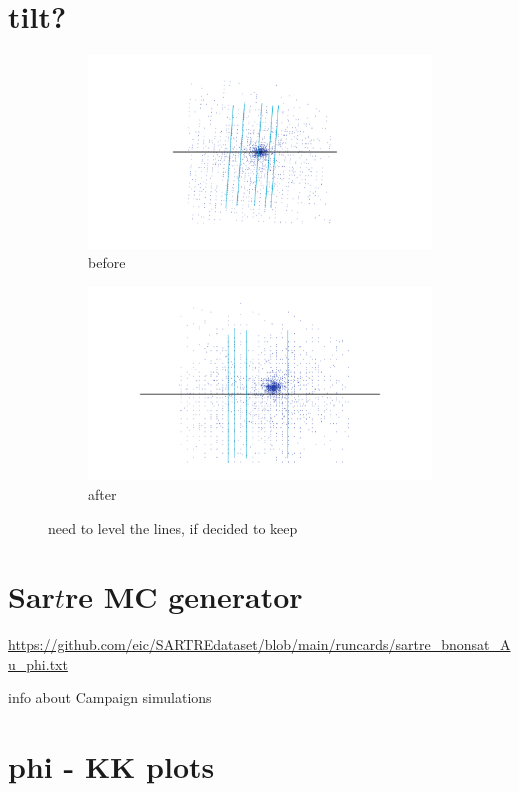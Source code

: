 \section{tilt?}
\begin{figure}[H]
    \begin{subfigure}{.48\linewidth}
        \centering
        \includegraphics[width=\linewidth]{img/orig_config_clusters.pdf}
        \caption{before}
        \label{fig:work:tilt:before}
    \end{subfigure}
    \begin{subfigure}{.48\linewidth}
        \centering
        \includegraphics[width=\linewidth]{img/every_rot_removed_clusters.pdf}
        \caption{after}
        \label{fig:work:tilt:after}  
    \end{subfigure}
    \caption{need to level the lines, if decided to keep}
    \label{fig:work:tilt}
\end{figure}

\section{Sar$t$re MC generator}

\url{https://github.com/eic/SARTREdataset/blob/main/runcards/sartre_bnonsat_Au_phi.txt}

info about Campaign simulations

\section{phi - KK plots}